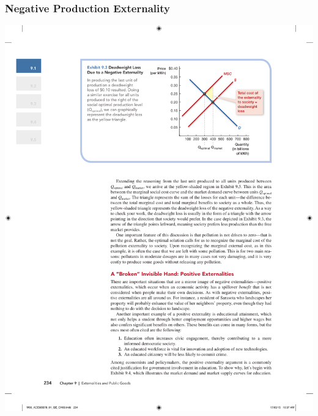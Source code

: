 \documentclass[12pt, xcolor=dvipsnames]{beamer}
\begin{document}
\begin{frame}
\frametitle{\bf Negative Production Externality}
\begin{center}
\includegraphics[height=.85\textheight]{figures/5.pdf}
\end{center}
\end{frame}
\end{document}
